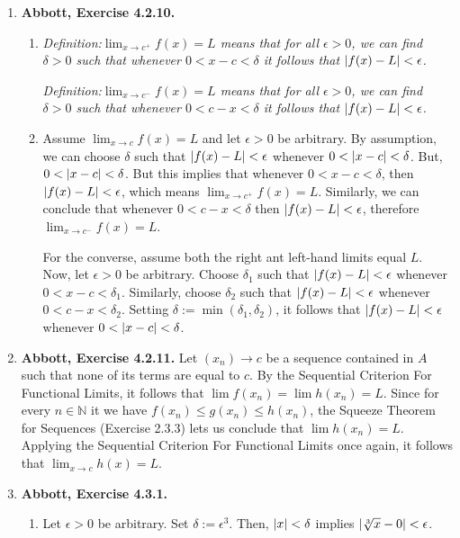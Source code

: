 \documentclass{article}
\DeclarePairedDelimiter\abs{\lvert}{\rvert}
\newcommand{\N}{\mathbb{N}}
\newcommand{\exc}[2][Abbott]{\item \textbf{#1, Exercise #2.}}
\newcommand{\lep}[1][L]{#1et $\epsilon > 0$ be arbitrary}
\begin{document}
\begin{enumerate}
    \exc{4.2.10}
    \begin{enumerate}
        \item \em{Definition:}\em \space $\lim_{x \to c^+} f(x) = L$ means that for all $\epsilon > 0$, we can find $\delta > 0$ such that whenever  $0 < x-c < \delta$ it follows that $\abs{f(x) - L} < \epsilon$.
        
        \noindent \em{Definition:}\em \space $\lim_{x \to c^-} f(x) = L$ means that for all $\epsilon > 0$, we can find $\delta > 0$ such that whenever  $0 < c-x < \delta$ it follows that $\abs{f(x) - L} < \epsilon$.
        
        \item Assume $\lim_{x \to c} f(x) = L$ and \lep[l]. By assumption, we can choose $\delta$ such that $\abs{f(x)-L} < \epsilon$ whenever $0 < \abs{x-c} < \delta$. But, $0 < \abs{x-c}<\delta$. But this implies that whenever $0 < x-c < \delta$, then $\abs{f(x)-L} < \epsilon$, which means $\lim_{x \to c^+} f(x) = L$. Similarly, we can conclude that whenever $0 < c-x < \delta$ then $\abs{f(x)-L} < \epsilon$, therefore $\lim_{x \to c^-} f(x) = L$.
        
        For the converse, assume both the right ant left-hand limits equal $L$. Now, let $\epsilon > 0$ be arbitrary. Choose $\delta_1$ such that $\abs{f(x)-L} < \epsilon$ whenever $0 < x-c < \delta_1$. Similarly, choose $\delta_2$ such that $\abs{f(x)-L} < \epsilon$ whenever $0 < c-x < \delta_2$. Setting $\delta := \min(\delta_1, \delta_2)$, it follows that $\abs{f(x)-L} < \epsilon$ whenever $0 < \abs{x-c} < \delta$.
    \end{enumerate}
    
    \exc{4.2.11}
    Let $(x_n) \to c$ be a sequence contained in $A$ such that none of its terms are equal to $c$. By the Sequential Criterion For Functional Limits, it follows that $\lim f(x_n) = \lim h(x_n) = L$. Since for every $n \in \N$ it we have $f(x_n) \leq g(x_n) \leq h(x_n)$, the Squeeze Theorem for Sequences (Exercise 2.3.3) lets us conclude that $\lim h(x_n) = L$. Applying the Sequential Criterion For Functional Limits once again, it follows that $\lim_{x \to c} h(x) = L$.
    
    \exc{4.3.1}
    \begin{enumerate}
        \item \lep. Set $\delta := \epsilon^3$. Then, $\abs{x} < \delta$ implies 
        $\abs{\sqrt[3]{x}-0} < \epsilon$.
        

\end{enumerate}
\end{enumerate}
\end{document}
